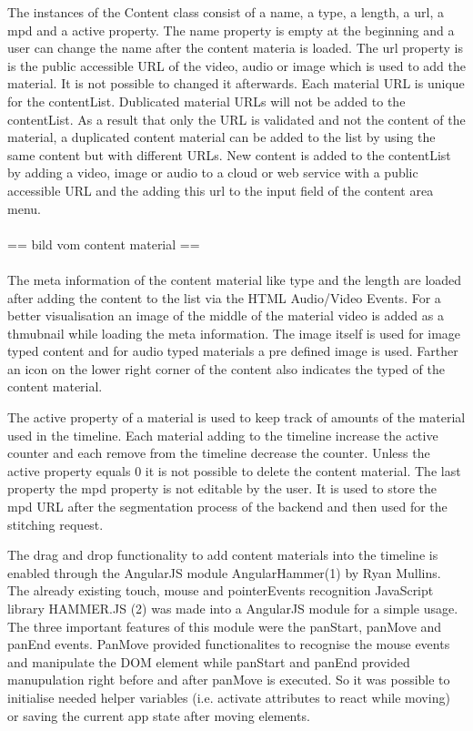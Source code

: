 \documentclass[conference]{IEEEtran}
\begin{document}
The instances of the Content class consist of a name, a type, a length, a url, a mpd and a active property. The name property is empty at the beginning and a user can change the name after the content materia is loaded. The url property is is the public accessible URL of the video, audio or image which is used to add the material. It is not possible to changed it afterwards. Each material URL is unique for the contentList. Dublicated material URLs will not be added to the contentList. As a result that only the URL is validated and not the content of the material, a duplicated content material can be added to the list by using the same content but with different URLs. New content is added to the contentList by adding a video, image or audio to a cloud or web service with a public accessible URL and the adding this url to the input field of the content area menu.\\
\\
== bild vom content material ==\\
\\
The meta information of the content material like type and the length are loaded after adding the content to the list via the HTML Audio/Video Events. For a better visualisation an image of the middle of the material video is added as a thmubnail while loading the meta information. The image itself is used for image typed content and for audio typed materials a pre defined image is used. Farther an icon on the lower right corner of the content also indicates the typed of the content material.

The active property of a material is used to keep track of amounts of the material used in the timeline. Each material adding to the timeline increase the active counter and each remove from the timeline decrease the counter. Unless the active property equals 0 it is not possible to delete the content material. The last property the mpd property is not editable by the user. It is used to store the mpd URL after the segmentation process of the backend and then used for the stitching request.

The drag and drop functionality to add content materials into the timeline is enabled through the AngularJS module AngularHammer(1) by Ryan Mullins. The already existing touch, mouse and pointerEvents recognition JavaScript library HAMMER.JS (2) was made into a AngularJS module for a simple usage. The three important features of this module were the panStart, panMove and panEnd events. PanMove provided functionalites to recognise the mouse events and manipulate the DOM element while panStart and panEnd provided manupulation right before and after panMove is executed. So it was possible to initialise needed helper variables (i.e. activate attributes to react while moving) or saving the current app state after moving elements.
\end{document}

